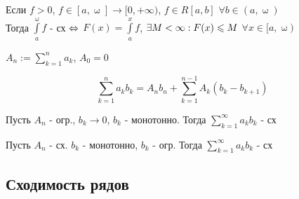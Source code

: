 \documentclass[main]{subfiles}
\begin{document}
    \begin{lemma}
        Если $f>0$, $f \in [a, \upomega] \rightarrow [0, +\infty)$, $f\in R[a,b]$ $\forall b \in (a, \upomega)$
        \\
        Тогда $\int\limits_a^\upomega f$ - сх $\Leftrightarrow$ $F(x) = \int\limits_a^x f$, $\exists M < \infty:  F(x) \leqslant M $ $\forall x \in [a, \upomega)$
    \end{lemma}

    \begin{definition}
        $A_n := \sum\limits_{k=1}^n a_k$, $A_0=0$
    \end{definition}

    \begin{Theorem} 
        \[\sum\limits_{k=1}^n a_k b_k = A_n b_n + \sum\limits_{k=1}^{n-1} A_k (b_k - b_{k+1})\]
    \end{Theorem}

    \begin{theorem} 
        Пусть $A_n$ - огр., $b_k \rightarrow 0$, $b_k$ - монотонно. Тогда $\sum\limits_{k=1}^\infty a_k b_k$ - сх
    \end{theorem}

    \begin{theorem} 
        Пусть $A_n$ - сх. $b_k$ - монотонно, $b_k$ - огр. Тогда $\sum\limits_{k=1}^\infty a_k b_k$ - сх
    \end{theorem}

    \newpage
    \subsection{Сходимость рядов}
\end{document}
